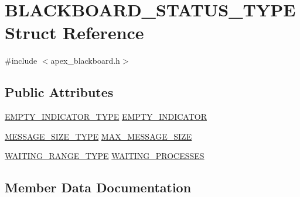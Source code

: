 \hypertarget{structBLACKBOARD__STATUS__TYPE}{}\section{B\+L\+A\+C\+K\+B\+O\+A\+R\+D\+\_\+\+S\+T\+A\+T\+U\+S\+\_\+\+T\+Y\+PE Struct Reference}
\label{structBLACKBOARD__STATUS__TYPE}


{\ttfamily \#include $<$apex\+\_\+blackboard.\+h$>$}

\subsection*{Public Attributes}
\begin{DoxyCompactItemize}
\item 
\hyperlink{apex__blackboard_8h_a52d437b2fe6a3f155749fdb1728945dc}{E\+M\+P\+T\+Y\+\_\+\+I\+N\+D\+I\+C\+A\+T\+O\+R\+\_\+\+T\+Y\+PE} \hyperlink{structBLACKBOARD__STATUS__TYPE_a192e4510defcf9489f031040521b07de}{E\+M\+P\+T\+Y\+\_\+\+I\+N\+D\+I\+C\+A\+T\+OR}
\item 
\hyperlink{apex__types_8h_ae09494a8d78c38c94f0cc5a80e69785a}{M\+E\+S\+S\+A\+G\+E\+\_\+\+S\+I\+Z\+E\+\_\+\+T\+Y\+PE} \hyperlink{structBLACKBOARD__STATUS__TYPE_aa948e8666ca80e22198c55b6a7dd6d2d}{M\+A\+X\+\_\+\+M\+E\+S\+S\+A\+G\+E\+\_\+\+S\+I\+ZE}
\item 
\hyperlink{apex__process_8h_a77a39a661169092676366eec0d65ab1c}{W\+A\+I\+T\+I\+N\+G\+\_\+\+R\+A\+N\+G\+E\+\_\+\+T\+Y\+PE} \hyperlink{structBLACKBOARD__STATUS__TYPE_aed254ad4d78c71f7d53c07be6da9063d}{W\+A\+I\+T\+I\+N\+G\+\_\+\+P\+R\+O\+C\+E\+S\+S\+ES}
\end{DoxyCompactItemize}


\subsection{Member Data Documentation}
